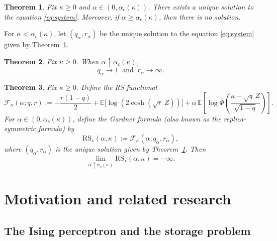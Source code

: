 \documentclass[11pt]{article}
\newtheorem{theorem}{Theorem}
\begin{document}
\begin{theorem}\label{thm:main}
Fix $\kappa\geq 0$ and $\alpha\in (0,\alpha_c(\kappa))$. There exists a unique solution to the equation \eqref{eq:system}. Moreover, if $\alpha\ge \alpha_c(\kappa)$, then there is no solution.
\end{theorem}
For $\alpha<\alpha_c(\kappa)$, let $(q_\alpha,r_\alpha)$ be the unique solution to the equation \eqref{eq:system} given by Theorem~\ref{thm:main}.
\begin{theorem}\label{thm:2ndmain}
Fix $\kappa\geq 0$. When $\alpha\uparrow\alpha_c(\kappa)$, \[
q_\alpha\to 1
\ \text{ and }\ 
r_\alpha\to\infty.
\]
\end{theorem}
\begin{theorem}\label{thm: bound for threshold}
Fix $\kappa\geq 0$. 
 Define the RS functional
\begin{equation}\label{eq:RSfunctional}
\mathcal F_\kappa(\alpha;q,r)
:=
-\frac{r(1-q)}{2}
+\mathbb E\big[\log(2\cosh(\sqrt r\,Z))\big]
+\alpha\,\mathbb E\!\left[\log \overline\Phi\!\left(\frac{\kappa-\sqrt q\,Z}{\sqrt{1-q}}\right)\right].
\end{equation}
For $\alpha\in(0,\alpha_c(\kappa))$, define the Gardner formula (also known as the replica-symmetric formula) by $$\mathrm{RS}_\star(\alpha,\kappa):=\mathcal F_\kappa(\alpha;q_\alpha,r_\alpha),$$
where $(q_\alpha,r_\alpha)$ is the unique solution given by Theorem~\ref{thm:main}. Then
\[
\lim_{\alpha\uparrow\alpha_c(\kappa)} \mathrm{RS}_\star(\alpha,\kappa)=-\infty.
\]
\end{theorem}
\section{Motivation and related research}

\subsection{The Ising perceptron and the storage problem}
\end{document}
